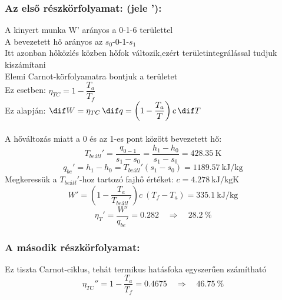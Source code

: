 \subsubsection{Az első részkörfolyamat: (jele '):}
A kinyert munka W' arányos a 0-1-6 területtel 
\\A bevezetett hő arányos az $s_0$-0-1-$s_1$
\\Itt azonban hőközlés közben hőfok változik,ezért területintegrálással tudjuk kiszámítani
\\Elemi Carnot-körfolyamatra bontjuk a területet
\\Ez esetben:  $\eta_{TC}=1-\dfrac{T_a}{T_f}$
\\Ez alapján:	$\dif W=\eta_{TC} \!\ \dif q= \left (1-\dfrac{T_a}{T} \right) c \!\ \dif T$
\\\\A hőváltozás miatt a 0 és az 1-es pont között bevezetett hő:
\begin{equation*}
	T_{be \textit{átl}}'=\dfrac{q_{0 - 1}} {s_1 - s_0}=\dfrac{h_1-h_0}{s_1-s_0}=\SI{428.35}{\kelvin}	
\end{equation*}
\begin{equation*}
	q_{be}'=h_1 - h_0=T_{be\textit{átl}}' \left (s_1-s_0 \right)=\SI{1189.57}{\kilo\joule\per\kilogram}	
\end{equation*}
Megkeressük a $T_{be \textit{átl}}'$-hoz tartozó fajhő értéket: $c=\SI{4.278}{\kilo\joule\per\kilogram\kelvin}$
\begin{equation*}
	W'=\left (1-\dfrac{T_a}{T_{be\textit{átl}}'} \right) c \!\ \left(T_f-T_a \right)=\SI{335.1}{\kilo\joule\per\kilogram}	
\end{equation*}
\begin{equation*}
	\eta_T'=\dfrac{W'}{q_{be}'}=\SI{0.282}
	\quad
	\Rightarrow
	\quad
	\SI{28.2}{\%}	
\end{equation*}
\subsubsection{A második részkörfolyamat:}
Ez tiszta Carnot-ciklus, tehát termikus hatásfoka egyszerűen számítható
\begin{equation*}
	\eta_{TC}''=1-\dfrac{T_a}{T_f}=\SI{0.4675}
	\quad
	\Rightarrow
	\quad
	\SI{46.75}{\%}	
\end{equation*}
